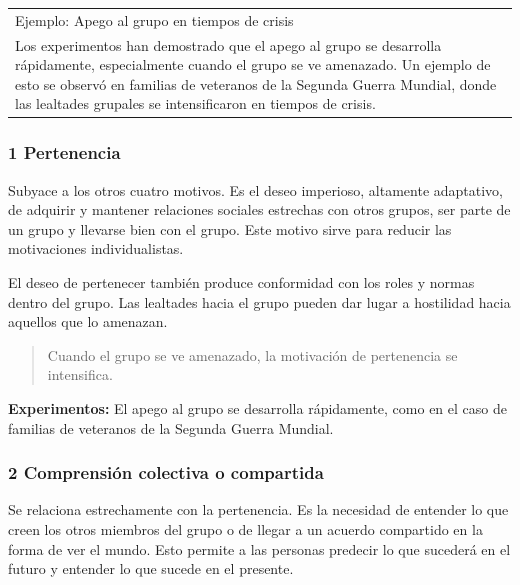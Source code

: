 \documentclass[
]{website}
\begin{document}
\begin{longtable}[]{@{}
  >{\raggedright\arraybackslash}p{}@{}}
\toprule\noalign{}
\endhead
\bottomrule\noalign{}
\endlastfoot
Ejemplo: Apego al grupo en tiempos de crisis \\
Los experimentos han demostrado que el apego al grupo se desarrolla rápidamente, especialmente cuando el grupo se ve amenazado. Un ejemplo de esto se observó en familias de veteranos de la Segunda Guerra Mundial, donde las lealtades grupales se intensificaron en tiempos de crisis. \\
\end{longtable}

\subsubsection*{1 Pertenencia}\label{subtema2_2_1}

Subyace a los otros cuatro motivos. Es el deseo imperioso, altamente adaptativo, de adquirir y mantener relaciones sociales estrechas con otros grupos, ser parte de un grupo y llevarse bien con el grupo. Este motivo sirve para reducir las motivaciones individualistas.

El deseo de pertenecer también produce conformidad con los roles y normas dentro del grupo. Las lealtades hacia el grupo pueden dar lugar a hostilidad hacia aquellos que lo amenazan.

\begin{quote}
Cuando el grupo se ve amenazado, la motivación de pertenencia se intensifica.
\end{quote}

\textbf{Experimentos:} El apego al grupo se desarrolla rápidamente, como en el caso de familias de veteranos de la Segunda Guerra Mundial.

\subsubsection*{2 Comprensión colectiva o compartida}\label{subtema2_2_2}

Se relaciona estrechamente con la pertenencia. Es la necesidad de entender lo que creen los otros miembros del grupo o de llegar a un acuerdo compartido en la forma de ver el mundo. Esto permite a las personas predecir lo que sucederá en el futuro y entender lo que sucede en el presente.
\end{document}
